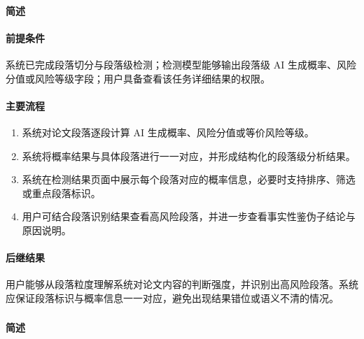 \paragraph*{简述}


\paragraph*{前提条件}

系统已完成段落切分与段落级检测；检测模型能够输出段落级 AI 生成概率、风险分值或风险等级字段；用户具备查看该任务详细结果的权限。

\paragraph*{主要流程}

\begin{enumerate}
    \item 系统对论文段落逐段计算 AI 生成概率、风险分值或等价风险等级。
    \item 系统将概率结果与具体段落进行一一对应，并形成结构化的段落级分析结果。
    \item 系统在检测结果页面中展示每个段落对应的概率信息，必要时支持排序、筛选或重点段落标识。
    \item 用户可结合段落识别结果查看高风险段落，并进一步查看事实性鉴伪子结论与原因说明。
\end{enumerate}

\paragraph*{后继结果}

用户能够从段落粒度理解系统对论文内容的判断强度，并识别出高风险段落。系统应保证段落标识与概率信息一一对应，避免出现结果错位或语义不清的情况。

\subsubsection{}

\paragraph*{简述}



